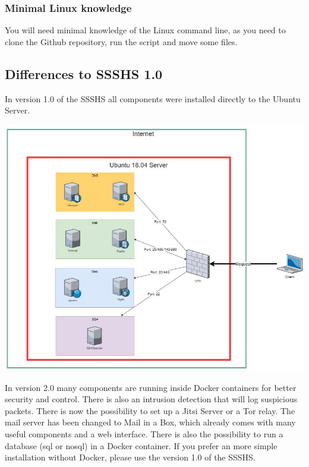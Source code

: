 \documentclass[a4paper,10pt]{scrartcl}
\begin{document}
\subsubsection{Minimal Linux knowledge}

You will need minimal knowledge of the Linux command line, as you need to clone the Github repository, run the script and move some files.

\pagebreak


\subsection{Differences to SSSHS 1.0}

In version 1.0 of the SSSHS all components were installed directly to the Ubuntu Server. \newline

\includegraphics[width=\textwidth]{overview}

\pagebreak

\noindent In version 2.0 many components are running inside Docker containers for better security and control. There is also an intrusion detection that will log suspicious packets. There is now the possibility to set up a Jitsi Server or a Tor relay. The mail server has been changed to Mail in a Box, which already comes with many useful components and a web interface. There is also the possibility to run a database (sql or nosql) in a Docker container. If you prefer an more simple installation without Docker, please use the version 1.0 of the SSSHS. \newline
\end{document}
